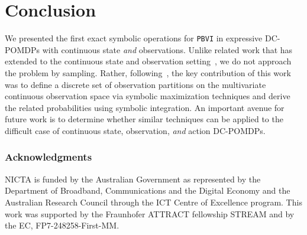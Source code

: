 \documentclass{article} %
\begin{document}
\section{Conclusion} 
%
%
We presented the first exact symbolic operations for \texttt{PBVI} in
expressive DC-POMDPs with continuous state \emph{and} observations.
Unlike related work that has extended to the continuous state and
observation setting~\cite{Perseus_cont}, we do not approach the
problem by sampling.  Rather, following~\cite{pascal_ijcai05}, the key
contribution of this work was to define a discrete set of observation
partitions on the multivariate continuous observation space via
symbolic maximization techniques and derive the related probabilities
using symbolic integration.  An important avenue for future work is to
determine whether similar techniques can be applied to the difficult
case of continuous state, observation, \emph{and} action DC-POMDPs.

\subsubsection*{Acknowledgments}

NICTA is funded by the Australian Government as represented by the Department of Broadband, Communications and the Digital Economy and the Australian Research Council through the ICT Centre of Excellence program. This work was supported by the Fraunhofer ATTRACT fellowship STREAM and by the EC, FP7-248258-First-MM.


\end{document}
